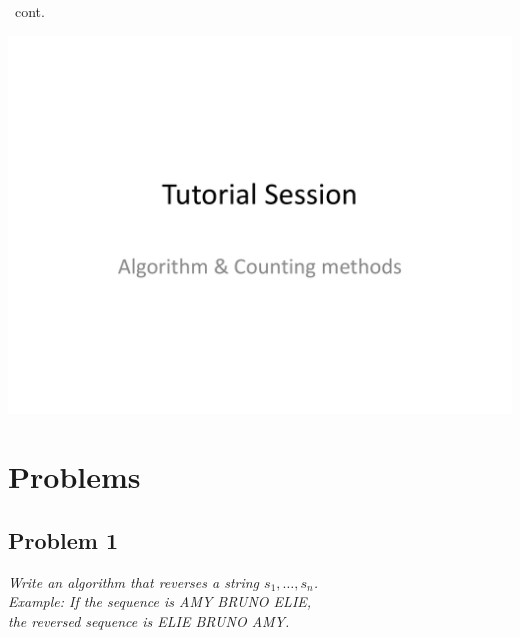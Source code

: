 \documentclass[handout]{beamer}
\begin{document}
    \begin{frame}[c,shrink]{\secname\ cont.}
        \centerline{\includegraphics[height=0.85\textheight,page=6]{algo_counting}}
    \end{frame}
    
    
    
\section{Problems}



    \subsection{Problem 1}
    
        \begin{frame}[c]{\subsecname}
            \textit{Write an algorithm that reverses a string $s_1,\ldots,s_n$.\\
            Example: If the sequence is AMY BRUNO ELIE,\\
            the reversed sequence is ELIE BRUNO AMY.}            
        \end{frame}
        
\end{document}
